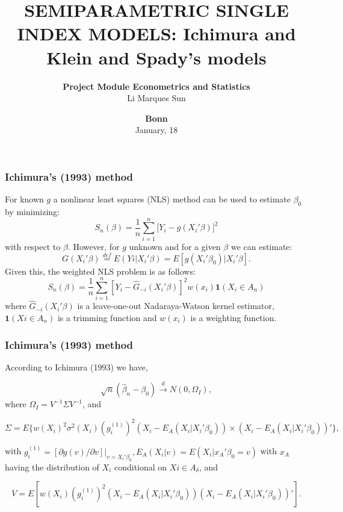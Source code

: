 \documentclass[11pt]{beamer}
\begin{document}
\title{SEMIPARAMETRIC SINGLE INDEX MODELS: Ichimura and Klein and Spady's models}

\author[Li Marques Sun] %
{
{\bf Project Module Econometrics and Statistics}\\
{\small Li Marques Sun}\\[1ex]
}

\date{
{\bf Bonn}\\
{\small January, 18}
}


\begin{frame}
    \titlepage
    \note{~}
\end{frame}


\begin{frame}[t]
    \frametitle{Ichimura's (1993) method}
For known $g$ a nonlinear least squares (NLS) method can be used to estimate $\beta_0$ by minimizing:
\begin{equation}
S_n(\beta) = \frac{1}{n}\sum_{i = 1}^n\big[Y_i - g(X_i'\beta)\big]^2
\end{equation}
with respect to $\beta$. However, for $g$ unknown and for a given $\beta$ we can estimate:
\begin{equation}
G(X_i'\beta) \stackrel{def}{=} E(Yi|X_i'\beta) = E[g(X_i'\beta_0)|X_i'\beta].
\end{equation}
Given this, the weighted NLS problem is as follows:
\begin{equation}
S_n(\beta) = \frac{1}{n} \sum_{i=1}^{n}  [Y_i - \hat{G}_{-i}(X_i'\beta)]^2w(x_i)\mathbf{1}{(X_i \in A_n)}
\end{equation}
where $\hat{G}_{-i}(X_i'\beta)$ is a leave-one-out Nadaraya-Watson kernel estimator,  $\mathbf{1}{(Xi \in A_n)}$ is a trimming function and $w(x_i)$ is a weighting function.

\end{frame}



\begin{frame}[t]
    \frametitle{Ichimura's (1993) method}
    
\begin{theorem}
According to Ichimura (1993) we have,



\[ \sqrt{n}(\hat{\beta}_n - \beta_0) \stackrel{d}{\rightarrow} N(0,\Omega_I), \] where $\Omega_I = V^{-1}\Sigma V^{-1}$, and

\[\Sigma = E\{w(X_i)^2\sigma^2(X_i)(g_i^{(1)})^2(X_i - E_A(X_i|X_i'\beta_0)) \times (X_i - E_A(X_i|X_i'\beta_0))'\},\]

with $g_i^{(1)} = [\partial g(v)/\partial v]|_{v = X_i'\beta_0}, E_A(X_i|v) = E(X_i|x_A'\beta_0 = v)$ with $x_A$ having the distribution of $X_i$ conditional on $Xi \in A_\delta$, and

\[ V = E[w(X_i)(g_i^{(1)})^2(X_i - E_A(X_i|X_i'\beta_0))(X_i - E_A(X_i|X_i'\beta_0))'].\]

\end{theorem}
\end{frame}
\end{document}
